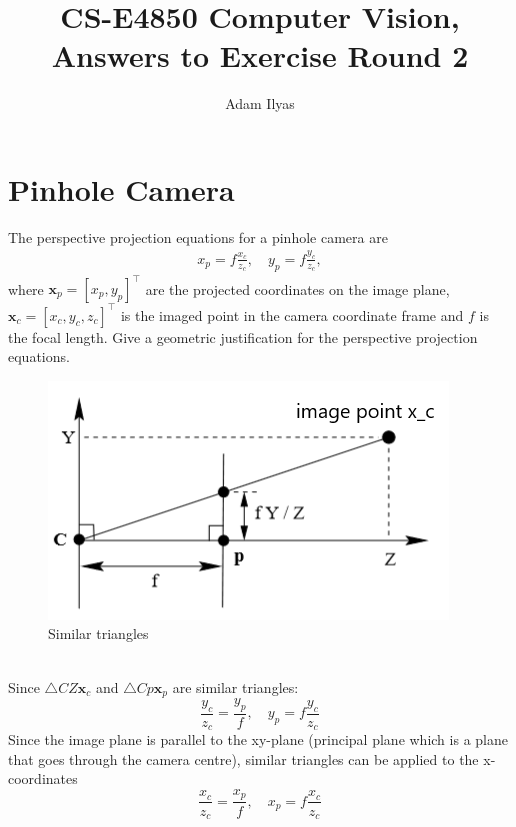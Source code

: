 \documentclass[a4paper,12pt]{article}
\author{Adam Ilyas}
\title{
CS-E4850 Computer Vision, \\
Answers to Exercise Round 2
}
\begin{document}
\vspace{8pt}

\maketitle

\section{Pinhole Camera}
The perspective projection equations for a pinhole camera are
\begin{equation}
\begin{split}
x_p = f\frac{x_c}{z_c}, \quad y_p = f\frac{y_c}{z_c}, 
\end{split}
\end{equation}
where $\mathbf{x}_p = [x_p,y_p]^\intercal$ are the projected coordinates on the image plane, $\mathbf{x}_c = [x_c,y_c,z_c]^\intercal$ is the imaged point in the camera coordinate frame and $f$ is the focal length. Give a geometric justification for the perspective projection equations.
\begin{figure}[!ht]
	\begin{center}
    \includegraphics[scale=0.8]{pic1.png}
    \caption{Similar triangles}
	\end{center}
\end{figure}\\
Since $\triangle CZ\mathbf{x}_c$ and $\triangle Cp\mathbf{x}_p$ are similar triangles: $$\frac{y_c}{z_c} = \frac{y_p}{f}, \quad y_p = f\frac{y_c}{z_c}$$Since the image plane is parallel to the xy-plane (principal plane which is a plane that goes through the camera centre), similar triangles can be applied to the x-coordinates $$\frac{x_c}{z_c} = \frac{x_p}{f}, \quad x_p = f\frac{x_c}{z_c}$$
\end{document}
